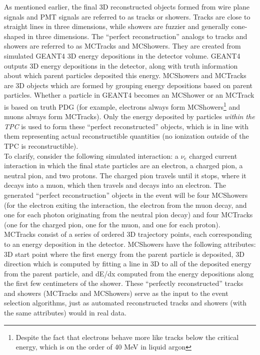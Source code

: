 As mentioned earlier, the final 3D reconstructed objects formed from wire plane signals and PMT signals are referred to as tracks or showers. Tracks are close to straight lines in three dimensions, while showers are fuzzier and generally cone-shaped in three dimensions. The ``perfect reconstruction'' analogs to tracks and showers are referred to as {\sc MCTracks} and {\sc MCShowers}. They are created from simulated {\sc GEANT4} 3D energy depositions in the detector volume. {\sc GEANT4} outputs 3D energy depositions in the detector, along with truth information about which parent particles deposited this energy. {\sc MCShowers} and {\sc MCTracks} are 3D objects which are formed by grouping energy depositions based on parent particles. Whether a particle in {\sc GEANT4} becomes an {\sc MCShower} or an {\sc MCTrack} is based on truth PDG (for example, electrons always form {\sc MCShower}s\footnote{Despite the fact that electrons behave more like tracks below the critical energy, which is on the order of 40 MeV in liquid argon} and muons always form {\sc MCTrack}s). Only the energy deposited by particles \textit{within the TPC} is used to form these ``perfect reconstructed'' objects, which is in line with them representing actual reconstructible quantities (no ionization outside of the TPC is reconstructible).\\

To clarify, consider the following simulated interaction: a $\nu_e$ charged current interaction in which the final state particles are an electron, a charged pion, a neutral pion, and two protons. The charged pion travels until it stops, where it decays into a muon, which then travels and decays into an electron. The generated ``perfect reconstruction'' objects in the event will be four {\sc MCShower}s (for the electron exiting the interaction, the electron from the muon decay, and one for each photon originating from the neutral pion decay) and four {\sc MCTracks} (one for the charged pion, one for the muon, and one for each proton).\\

{\sc MCTracks} consist of a series of ordered 3D trajectory points, each corresponding to an energy deposition in the detector. {\sc MCShowers} have the following attributes: 3D start point where the first energy from the parent particle is deposited, 3D direction which is computed by fitting a line in 3D to all of the deposited energy from the parent particle, and dE/dx computed from the energy depositions along the first few centimeters of the shower. These ``perfectly reconstructed'' tracks and showers ({\sc MCTracks} and {\sc MCShowers}) serve as the input to the event selection algorithms, just as automated reconstructed tracks and showers (with the same attributes) would in real data.\\




